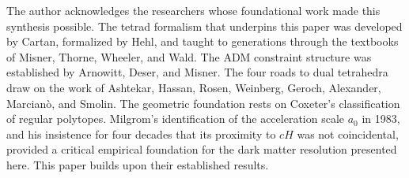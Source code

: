 \documentclass[aps,prd,preprint,superscriptaddress,showpacs,preprintnumbers,amsmath,amssymb,nofootinbib]{revtex4-2}
\begin{document}
\begin{acknowledgments}
The author acknowledges the researchers whose foundational work made this synthesis possible. The tetrad formalism that underpins this paper was developed by Cartan, formalized by Hehl, and taught to generations through the textbooks of Misner, Thorne, Wheeler, and Wald. The ADM constraint structure was established by Arnowitt, Deser, and Misner. The four roads to dual tetrahedra draw on the work of Ashtekar, Hassan, Rosen, Weinberg, Geroch, Alexander, Marcian\`o, and Smolin. The geometric foundation rests on Coxeter's classification of regular polytopes. Milgrom's identification of the acceleration scale $a_0$ in 1983, and his insistence for four decades that its proximity to $cH$ was not coincidental, provided a critical empirical foundation for the dark matter resolution presented here. This paper builds upon their established results.
\end{acknowledgments}
\end{document}
